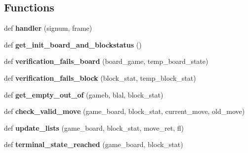 \subsection*{Functions}
\begin{DoxyCompactItemize}
\item 
def {\bfseries handler} (signum, frame)\hypertarget{namespacesimulator_a46f8d8f28740495ed8d5b41ea437dcb4}{}\label{namespacesimulator_a46f8d8f28740495ed8d5b41ea437dcb4}

\item 
def {\bfseries get\+\_\+init\+\_\+board\+\_\+and\+\_\+blockstatus} ()\hypertarget{namespacesimulator_a8e45993e8444b066b05673131b158973}{}\label{namespacesimulator_a8e45993e8444b066b05673131b158973}

\item 
def {\bfseries verification\+\_\+fails\+\_\+board} (board\+\_\+game, temp\+\_\+board\+\_\+state)\hypertarget{namespacesimulator_a3adefd4f4546beaf1d94585c78e85a82}{}\label{namespacesimulator_a3adefd4f4546beaf1d94585c78e85a82}

\item 
def {\bfseries verification\+\_\+fails\+\_\+block} (block\+\_\+stat, temp\+\_\+block\+\_\+stat)\hypertarget{namespacesimulator_a5253b1378b135994092a20df7de18273}{}\label{namespacesimulator_a5253b1378b135994092a20df7de18273}

\item 
def {\bfseries get\+\_\+empty\+\_\+out\+\_\+of} (gameb, blal, block\+\_\+stat)\hypertarget{namespacesimulator_ada9d7d7d9212b14a7afd6e15f4cabb34}{}\label{namespacesimulator_ada9d7d7d9212b14a7afd6e15f4cabb34}

\item 
def {\bfseries check\+\_\+valid\+\_\+move} (game\+\_\+board, block\+\_\+stat, current\+\_\+move, old\+\_\+move)\hypertarget{namespacesimulator_a67b5cc82640109b7cc386627b5613604}{}\label{namespacesimulator_a67b5cc82640109b7cc386627b5613604}

\item 
def {\bfseries update\+\_\+lists} (game\+\_\+board, block\+\_\+stat, move\+\_\+ret, fl)\hypertarget{namespacesimulator_a5b33c2bde7e0b8345b2390f6856e2891}{}\label{namespacesimulator_a5b33c2bde7e0b8345b2390f6856e2891}

\item 
def {\bfseries terminal\+\_\+state\+\_\+reached} (game\+\_\+board, block\+\_\+stat)\hypertarget{namespacesimulator_a6053b210441089cd163978de2542aa26}{}\label{namespacesimulator_a6053b210441089cd163978de2542aa26}


\end{DoxyCompactItemize}
